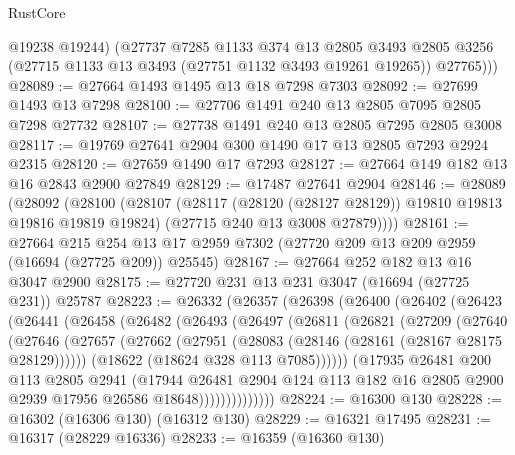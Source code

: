 \begin{lexlean}{RustCore}
\begin{coremodule}
          @19238
          @19244)
        (@27737
          @7285
          @1133
          @374
          @13
          @2805
          @3493
          @2805
          @3256
          (@27715 @1133 @13 @3493 (@27751 @1132 @3493 @19261 @19265))
          @27765)))
@28089 := @27664 @1493 @1495 @13 @18 @7298 @7303
@28092 := @27699 @1493 @13 @7298
@28100 := @27706 @1491 @240 @13 @2805 @7095 @2805 @7298 @27732
@28107 := @27738 @1491 @240 @13 @2805 @7295 @2805 @3008
@28117 := @19769 @27641 @2904 @300 @1490 @17 @13 @2805 @7293 @2924 @2315
@28120 := @27659 @1490 @17 @7293
@28127 := @27664 @149 @182 @13 @16 @2843 @2900 @27849
@28129 := @17487 @27641 @2904
@28146 := @28089
    (@28092
      (@28100
        (@28107
          (@28117 (@28120 (@28127 @28129)) @19810 @19813 @19816 @19819 @19824)
          (@27715 @240 @13 @3008 @27879))))
@28161 := @27664
    @215
    @254
    @13
    @17
    @2959
    @7302
    (@27720 @209 @13 @209 @2959 (@16694 (@27725 @209)) @25545)
@28167 := @27664 @252 @182 @13 @16 @3047 @2900
@28175 := @27720 @231 @13 @231 @3047 (@16694 (@27725 @231)) @25787
@28223 := @26332
    (@26357
      (@26398
        (@26400
          (@26402
            (@26423
              (@26441
                (@26458
                  (@26482
                    (@26493
                      (@26497
                        (@26811
                          (@26821
                            (@27209
                              (@27640
                                (@27646
                                  (@27657
                                    (@27662
                                      (@27951 (@28083 (@28146 (@28161 (@28167 @28175 @28129))))))
                                    (@18622 (@18624 @328 @113 @7085))))))
                            (@17935
                              @26481
                              @200
                              @113
                              @2805
                              @2941
                              (@17944
                                @26481
                                @2904
                                @124
                                @113
                                @182
                                @16
                                @2805
                                @2900
                                @2939
                                @17956
                                @26586
                                @18648))))))))))))))
@28224 := @16300 @130
@28228 := @16302 (@16306 @130) (@16312 @130)
@28229 := @16321 @17495
@28231 := @16317 (@28229 @16336)
@28233 := @16359 (@16360 @130)

\end{coremodule}
\end{lexlean}
